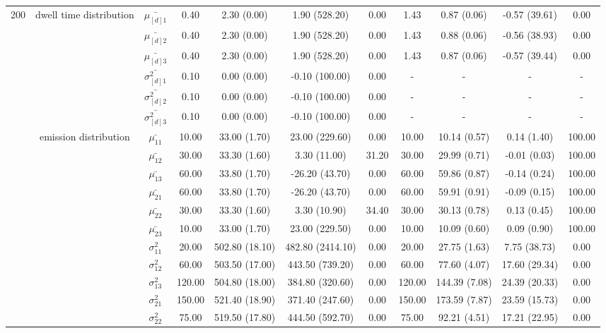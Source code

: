 \begin{table}[h]
{\begin{tabular}{ccccccccccc}
200 & dwell time distribution & $\bar{\mu_{[d]1}}$ & 0.40 & 2.30 (0.00) & 1.90 (528.20) & 0.00 & 1.43 & 0.87 (0.06) & -0.57 (39.61) & 0.00 \\
\multirow{26}{*}{} & \multirow{5}{*}{} & $\bar{\mu_{[d]2}}$ & 0.40 & 2.30 (0.00) & 1.90 (528.20) & 0.00 & 1.43 & 0.88 (0.06) & -0.56 (38.93) & 0.00 \\
 &  & $\bar{\mu_{[d]3}}$ & 0.40 & 2.30 (0.00) & 1.90 (528.20) & 0.00 & 1.43 & 0.87 (0.06) & -0.57 (39.44) & 0.00 \\
 &  & $\bar{\sigma^2_{[d]1}}$ & 0.10 & 0.00 (0.00) & -0.10 (100.00) & 0.00 & - & - & - & - \\
 &  & $\bar{\sigma^2_{[d]2}}$ & 0.10 & 0.00 (0.00) & -0.10 (100.00) & 0.00 & - & - & - & - \\
 &  & $\bar{\sigma^2_{[d]3}}$ & 0.10 & 0.00 (0.00) & -0.10 (100.00) & 0.00 & - & - & - & - \\
 & emission distribution & $\bar{\mu_{11}}$ & 10.00 & 33.00 (1.70) & 23.00 (229.60) & 0.00 & 10.00 & 10.14 (0.57) & 0.14 (1.40) & 100.00 \\
 & \multirow{11}{*}{} & $\bar{\mu_{12}}$ & 30.00 & 33.30 (1.60) & 3.30 (11.00) & 31.20 & 30.00 & 29.99 (0.71) & -0.01 (0.03) & 100.00 \\
 &  & $\bar{\mu_{13}}$ & 60.00 & 33.80 (1.70) & -26.20 (43.70) & 0.00 & 60.00 & 59.86 (0.87) & -0.14 (0.24) & 100.00 \\
 &  & $\bar{\mu_{21}}$ & 60.00 & 33.80 (1.70) & -26.20 (43.70) & 0.00 & 60.00 & 59.91 (0.91) & -0.09 (0.15) & 100.00 \\
 &  & $\bar{\mu_{22}}$ & 30.00 & 33.30 (1.60) & 3.30 (10.90) & 34.40 & 30.00 & 30.13 (0.78) & 0.13 (0.45) & 100.00 \\
 &  & $\bar{\mu_{23}}$ & 10.00 & 33.00 (1.70) & 23.00 (229.50) & 0.00 & 10.00 & 10.09 (0.60) & 0.09 (0.90) & 100.00 \\
 &  & $\sigma^2_{11}$ & 20.00 & 502.80 (18.10) & 482.80 (2414.10) & 0.00 & 20.00 & 27.75 (1.63) & 7.75 (38.73) & 0.00 \\
 &  & $\sigma^2_{12}$ & 60.00 & 503.50 (17.00) & 443.50 (739.20) & 0.00 & 60.00 & 77.60 (4.07) & 17.60 (29.34) & 0.00 \\
 &  & $\sigma^2_{13}$ & 120.00 & 504.80 (18.00) & 384.80 (320.60) & 0.00 & 120.00 & 144.39 (7.08) & 24.39 (20.33) & 0.00 \\
 &  & $\sigma^2_{21}$ & 150.00 & 521.40 (18.90) & 371.40 (247.60) & 0.00 & 150.00 & 173.59 (7.87) & 23.59 (15.73) & 0.00 \\
 &  & $\sigma^2_{22}$ & 75.00 & 519.50 (17.80) & 444.50 (592.70) & 0.00 & 75.00 & 92.21 (4.51) & 17.21 (22.95) & 0.00 \\

\end{tabular}}
\end{table}
